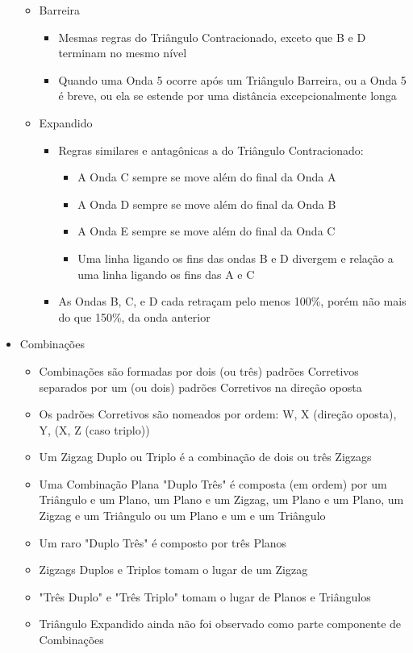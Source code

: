 \documentclass[12pt]{article}
\begin{document}
\begin{itemize}
\begin{itemize}
		\item Barreira
		\begin{itemize}
			\item Mesmas regras do Triângulo Contracionado, exceto que B e D terminam no mesmo nível
			\item Quando uma Onda 5 ocorre após um Triângulo Barreira, ou a Onda 5 é breve, ou ela se estende por uma distância excepcionalmente longa
		\end{itemize}
		\item Expandido
		\begin{itemize}
			\item Regras similares e antagônicas a do Triângulo Contracionado:
			\begin{itemize}
				\item A Onda C sempre se move além do final da Onda A
				\item A Onda D sempre se move além do final da Onda B
				\item A Onda E sempre se move além do final da Onda C
				\item Uma linha ligando os fins das ondas B e D divergem e relação a uma linha ligando os fins das A e C
			\end{itemize}
			\item As Ondas B, C, e D cada retraçam pelo menos 100\%, porém não mais do que 150\%, da onda anterior
		\end{itemize}
	\end{itemize}
	\item Combinações
	\begin{itemize}
		\item Combinações são formadas por dois (ou três) padrões Corretivos separados por um (ou dois) padrões Corretivos na direção oposta
		\item Os padrões Corretivos são nomeados por ordem: W, X (direção oposta), Y, (X, Z (caso triplo))
		\item Um Zigzag Duplo ou Triplo é a combinação de dois ou três Zigzags
		\item Uma Combinação Plana "Duplo Três" é composta (em ordem) por um Triângulo e um Plano, um Plano e um Zigzag, um Plano e um Plano, um Zigzag e um Triângulo ou um Plano e um e um Triângulo
		\item Um raro "Duplo Três" é composto por três Planos
		\item Zigzags Duplos e Triplos tomam o lugar de um Zigzag
		\item "Três Duplo" e "Três Triplo" tomam o lugar de Planos e Triângulos
		\item Triângulo Expandido ainda não foi observado como parte componente de Combinações
	\end{itemize}
\end{itemize}
	
\end{document}
